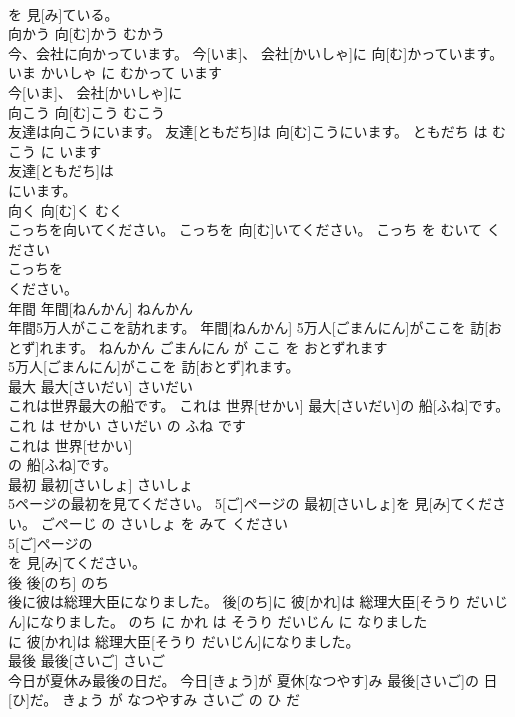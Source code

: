 \documentclass[8pt]{extreport}
\begin{document}
\begin{CJK}{UTF8}{min}
\\	を 見[み]ている。			
\\	向かう	向[む]かう	むかう	
\\	今、会社に向かっています。	今[いま]、 会社[かいしゃ]に 向[む]かっています。	いま かいしゃ に むかって います	
\\	今[いま]、 会社[かいしゃ]に
\\	向こう	向[む]こう	むこう	
\\	友達は向こうにいます。	友達[ともだち]は 向[む]こうにいます。	ともだち は むこう に います	
\\	友達[ともだち]は
\\	にいます。			
\\	向く	向[む]く	むく	
\\	こっちを向いてください。	こっちを 向[む]いてください。	こっち を むいて ください	
\\	こっちを
\\	ください。			
\\	年間	年間[ねんかん]	ねんかん	
\\	年間5万人がここを訪れます。	年間[ねんかん] 5万人[ごまんにん]がここを 訪[おとず]れます。	ねんかん ごまんにん が ここ を おとずれます	
\\	5万人[ごまんにん]がここを 訪[おとず]れます。			
\\	最大	最大[さいだい]	さいだい	
\\	これは世界最大の船です。	これは 世界[せかい] 最大[さいだい]の 船[ふね]です。	これ は せかい さいだい の ふね です	
\\	これは 世界[せかい]
\\	の 船[ふね]です。			
\\	最初	最初[さいしょ]	さいしょ	
\\	5ページの最初を見てください。	5[ご]ページの 最初[さいしょ]を 見[み]てください。	ごぺーじ の さいしょ を みて ください	
\\	5[ご]ページの
\\	を 見[み]てください。			
\\	後	後[のち]	のち	
\\	後に彼は総理大臣になりました。	後[のち]に 彼[かれ]は 総理大臣[そうり だいじん]になりました。	のち に かれ は そうり だいじん に なりました	
\\	に 彼[かれ]は 総理大臣[そうり だいじん]になりました。			
\\	最後	最後[さいご]	さいご	
\\	今日が夏休み最後の日だ。	今日[きょう]が 夏休[なつやす]み 最後[さいご]の 日[ひ]だ。	きょう が なつやすみ さいご の ひ だ	

\end{CJK}
\end{document}

